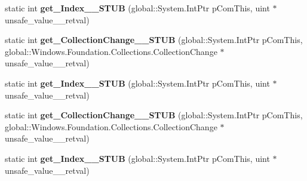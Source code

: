 \begin{DoxyCompactItemize}
\item 
\mbox{\label{struct_windows_1_1_foundation_1_1_collections_1_1_i_vector_changed_event_args_____impl_1_1_vtbl_a06e74647ee84efadaa99e3ed5bf6b337}} 
static int {\bfseries get\+\_\+\+Index\+\_\+\+\_\+\+S\+T\+UB} (global\+::\+System.\+Int\+Ptr p\+Com\+This, uint $\ast$unsafe\+\_\+value\+\_\+\+\_\+retval)
\item 
\mbox{\label{struct_windows_1_1_foundation_1_1_collections_1_1_i_vector_changed_event_args_____impl_1_1_vtbl_ac8b493654b0d9c8005afdb179f088f82}} 
static int {\bfseries get\+\_\+\+Collection\+Change\+\_\+\+\_\+\+S\+T\+UB} (global\+::\+System.\+Int\+Ptr p\+Com\+This, global\+::\+Windows.\+Foundation.\+Collections.\+Collection\+Change $\ast$unsafe\+\_\+value\+\_\+\+\_\+retval)
\item 
\mbox{\label{struct_windows_1_1_foundation_1_1_collections_1_1_i_vector_changed_event_args_____impl_1_1_vtbl_a06e74647ee84efadaa99e3ed5bf6b337}} 
static int {\bfseries get\+\_\+\+Index\+\_\+\+\_\+\+S\+T\+UB} (global\+::\+System.\+Int\+Ptr p\+Com\+This, uint $\ast$unsafe\+\_\+value\+\_\+\+\_\+retval)
\item 
\mbox{\label{struct_windows_1_1_foundation_1_1_collections_1_1_i_vector_changed_event_args_____impl_1_1_vtbl_ac8b493654b0d9c8005afdb179f088f82}} 
static int {\bfseries get\+\_\+\+Collection\+Change\+\_\+\+\_\+\+S\+T\+UB} (global\+::\+System.\+Int\+Ptr p\+Com\+This, global\+::\+Windows.\+Foundation.\+Collections.\+Collection\+Change $\ast$unsafe\+\_\+value\+\_\+\+\_\+retval)
\item 
\mbox{\label{struct_windows_1_1_foundation_1_1_collections_1_1_i_vector_changed_event_args_____impl_1_1_vtbl_a06e74647ee84efadaa99e3ed5bf6b337}} 
static int {\bfseries get\+\_\+\+Index\+\_\+\+\_\+\+S\+T\+UB} (global\+::\+System.\+Int\+Ptr p\+Com\+This, uint $\ast$unsafe\+\_\+value\+\_\+\+\_\+retval)
\end{DoxyCompactItemize}
